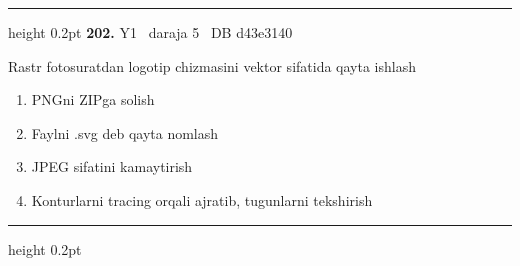\documentclass[10pt,a4paper,oneside]{article}
\begin{document}
\vspace{2mm}\hrule height 0.2pt \vspace{4mm}
\hypertarget{q202}{\textbf{\color{ink}202.}}  {\color{muted}\scriptsize Y1 \textbullet\ daraja 5 \textbullet\ DB d43e3140}
\par
Rastr fotosuratdan logotip chizmasini vektor sifatida qayta ishlash
\begin{enumerate}[label=\Alph*),leftmargin=9mm]
\item PNGni ZIPga solish
\item Faylni .svg deb qayta nomlash
\item JPEG sifatini kamaytirish
\item Konturlarni tracing orqali ajratib, tugunlarni tekshirish
\end{enumerate}
\vspace{2mm}\hrule height 0.2pt \vspace{4mm}
\end{document}
